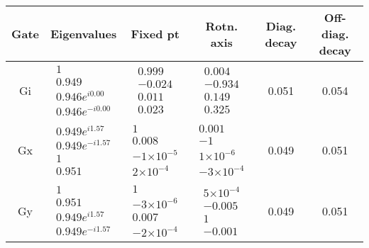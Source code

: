 \documentclass{article}[11pt]
\providecommand{\e}[1]{\ensuremath{\times 10^{#1}}}
\begin{document}
\begin{table}[h]
\small
\begin{center}
\begin{tabular}[l]{|c|c|c|c|c|c|}
\hline
Gate & Eigenvalues & Fixed pt & Rotn. axis & Diag. decay & Off-diag. decay \\ \hline
Gi & $ \begin{array}{c}
1 \\ 
0.949 \\ 
0.946e^{i0.00} \\ 
0.946e^{-i0.00}
 \end{array} $
 & $ \begin{array}{c}
0.999 \\ 
-0.024 \\ 
0.011 \\ 
0.023
 \end{array} $
 & $ \begin{array}{c}
0.004 \\ 
-0.934 \\ 
0.149 \\ 
0.325
 \end{array} $
 & 0.051 & 0.054 \\ \hline
Gx & $ \begin{array}{c}
0.949e^{i1.57} \\ 
0.949e^{-i1.57} \\ 
1 \\ 
0.951
 \end{array} $
 & $ \begin{array}{c}
1 \\ 
0.008 \\ 
-1\e{-5} \\ 
2\e{-4}
 \end{array} $
 & $ \begin{array}{c}
0.001 \\ 
-1 \\ 
1\e{-6} \\ 
-3\e{-4}
 \end{array} $
 & 0.049 & 0.051 \\ \hline
Gy & $ \begin{array}{c}
1 \\ 
0.951 \\ 
0.949e^{i1.57} \\ 
0.949e^{-i1.57}
 \end{array} $
 & $ \begin{array}{c}
1 \\ 
-3\e{-6} \\ 
0.007 \\ 
-2\e{-4}
 \end{array} $
 & $ \begin{array}{c}
5\e{-4} \\ 
-0.005 \\ 
1 \\ 
-0.001
 \end{array} $
 & 0.049 & 0.051 \\ \hline
\end{tabular}


\end{center}
\end{table}
\end{document}
